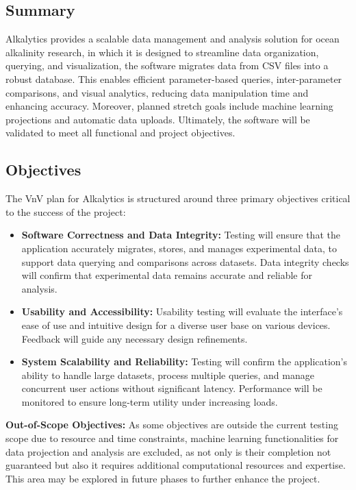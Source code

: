 \documentclass[12pt, titlepage]{article}
\begin{document}
\subsection{Summary}

Alkalytics provides a scalable data management and analysis solution for ocean
alkalinity research, in which it is designed to streamline data organization,
querying, and visualization, the software migrates data from CSV files into a
robust database. This enables efficient parameter-based queries, inter-parameter
comparisons, and visual analytics, reducing data manipulation time and enhancing
accuracy. Moreover, planned stretch goals include machine learning projections and
automatic data uploads. Ultimately, the software will be validated to meet all
functional and project objectives.


\subsection{Objectives}

The VnV plan for Alkalytics is structured around three primary objectives
critical to the success of the project:

\begin{itemize}
  \item \textbf{Software Correctness and Data Integrity:} Testing will ensure
  that the application accurately migrates, stores, and manages experimental
  data, to support data querying and comparisons across datasets. Data integrity
  checks will confirm that experimental data remains accurate and reliable for
  analysis.

  \item \textbf{Usability and Accessibility:} Usability testing will evaluate
  the interface’s ease of use and intuitive design for a diverse user base on
  various devices. Feedback will guide any necessary design refinements.
  
  \item \textbf{System Scalability and Reliability:} Testing will confirm the
  application's ability to handle large datasets, process multiple queries, and
  manage concurrent user actions without significant latency. Performance will
  be monitored to ensure long-term utility under increasing loads.
  
\end{itemize}

\noindent \textbf{Out-of-Scope Objectives:} As some objectives are outside the
current testing scope due to resource and time constraints, machine learning
functionalities for data projection and analysis are excluded, as not only is
their completion not guaranteed but also it requires additional computational
resources and expertise. This area may be explored in future phases to further
enhance the project.
\end{document}
